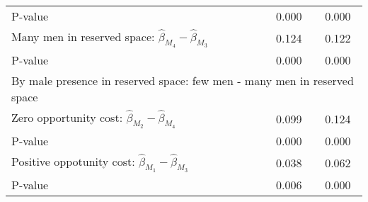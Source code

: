 \begin{tabular}{l*{2}{c}}
\quad P-value       &       0.000         &       0.000         \\
\quad Many men in reserved space: $\hat\beta_{M_4} - \hat\beta_{M_3}$ &       0.124         &       0.122         \\
\quad P-value       &       0.000         &       0.000         \\
\multicolumn{3}{l}{By male presence in reserved space: few men - many men in reserved space} \\ \quad Zero opportunity cost: $\hat\beta_{M_2} - \hat\beta_{M_4}$&       0.099         &       0.124         \\
\quad P-value       &       0.000         &       0.000         \\
\quad Positive oppotunity cost: $\hat\beta_{M_1} - \hat\beta_{M_3}$ &       0.038         &       0.062         \\
\quad P-value       &       0.006         &       0.000         \\
\hline\hline \end{tabular}
